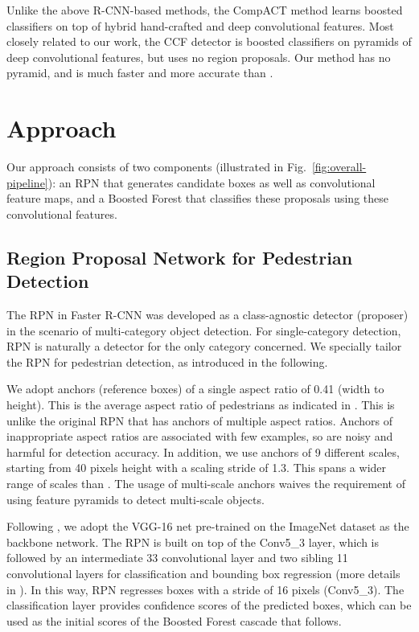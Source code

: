 \documentclass[runningheads]{llncs}
\begin{document}
Unlike the above R-CNN-based methods, the CompACT method \cite{cai2015learning} learns boosted classifiers on top of hybrid hand-crafted and deep convolutional features. Most closely related to our work, the CCF detector \cite{yang2015convolutional} is boosted classifiers on pyramids of deep convolutional features, but uses no region proposals. Our method has no pyramid, and is much faster and more accurate than \cite{yang2015convolutional}.

\section{Approach}

Our approach consists of two components (illustrated in Fig.~\ref{fig:overall-pipeline}): an RPN that generates candidate boxes as well as convolutional feature maps, and a Boosted Forest that classifies these proposals using these convolutional features.

\subsection{Region Proposal Network for Pedestrian Detection}

The RPN in Faster R-CNN \cite{ren2015faster} was developed as a class-agnostic detector (proposer) in the scenario of multi-category object detection. For single-category detection, RPN is naturally a detector for the only category concerned. We specially tailor the RPN for pedestrian detection, as introduced in the following. 

We adopt anchors (reference boxes) \cite{ren2015faster} of a single aspect ratio of 0.41 (width to height). This is the average aspect ratio of pedestrians as indicated in \cite{dollar2012pedestrian}. This is unlike the original RPN \cite{ren2015faster} that has anchors of multiple aspect ratios. Anchors of inappropriate aspect ratios are associated with few examples, so are noisy and harmful for detection accuracy.
In addition, we use anchors of 9 different scales, starting from 40 pixels height with a scaling stride of 1.3. This spans a wider range of scales than \cite{ren2015faster}. The usage of multi-scale anchors waives the requirement of using feature pyramids to detect multi-scale objects.

Following \cite{ren2015faster}, we adopt the VGG-16 net \cite{simonyan2014very} pre-trained on the ImageNet dataset \cite{ILSVRC15} as the backbone network. The RPN is built on top of the Conv5\_3 layer, which is followed by an intermediate 33 convolutional layer and two sibling 11 convolutional layers for classification and bounding box regression (more details in \cite{ren2015faster}). In this way, RPN regresses boxes with a stride of 16 pixels (Conv5\_3). The classification layer provides confidence scores of the predicted boxes, which can be used as the initial scores of the Boosted Forest cascade that follows.
\end{document}
